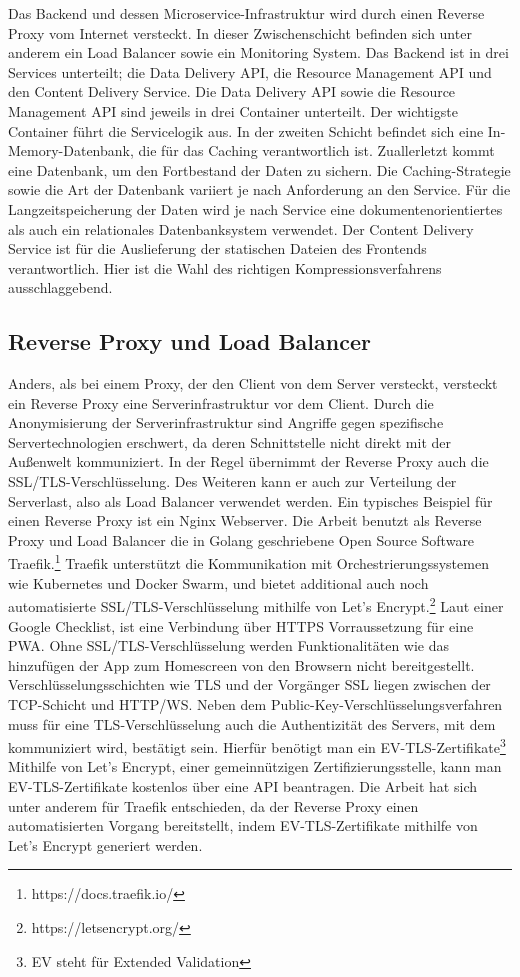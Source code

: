 Das Backend und dessen Microservice-Infrastruktur wird durch einen Reverse Proxy vom Internet versteckt.
In dieser Zwischenschicht befinden sich unter anderem ein Load Balancer sowie ein Monitoring System.
Das Backend ist in drei Services unterteilt; die Data Delivery API, die Resource Management API
und den Content Delivery Service. Die Data Delivery API sowie die Resource Management API sind jeweils
in drei Container unterteilt. Der wichtigste Container führt die Servicelogik aus. In der zweiten
Schicht befindet sich eine In-Memory-Datenbank, die für das Caching verantwortlich ist. Zuallerletzt
kommt eine Datenbank, um den Fortbestand der Daten zu sichern. Die Caching-Strategie sowie die Art der
Datenbank variiert je nach Anforderung an den Service. Für die Langzeitspeicherung der Daten wird je nach Service
eine dokumentenorientiertes als auch ein relationales Datenbanksystem verwendet. Der Content Delivery Service
ist für die Auslieferung der statischen Dateien des Frontends verantwortlich. Hier ist die Wahl des
richtigen Kompressionsverfahrens ausschlaggebend.

\subsection{Reverse Proxy und Load Balancer}
\label{subsec:reverseproxyundloadbalancer}
Anders, als bei einem Proxy, der den Client von dem Server versteckt, versteckt ein Reverse Proxy
eine Serverinfrastruktur vor dem Client. Durch die Anonymisierung der Serverinfrastruktur
sind Angriffe gegen spezifische Servertechnologien erschwert, da deren Schnittstelle
nicht direkt mit der Außenwelt kommuniziert. In der Regel übernimmt der Reverse Proxy
auch die SSL/TLS-Verschlüsselung. Des Weiteren kann er auch zur Verteilung der Serverlast,
also als Load Balancer verwendet werden. Ein typisches Beispiel für einen Reverse Proxy
ist ein Nginx Webserver. Die Arbeit benutzt als Reverse Proxy und Load Balancer die
in Golang geschriebene Open Source Software Traefik.\footnote{https://docs.traefik.io/}
Traefik unterstützt die Kommunikation mit Orchestrierungssystemen wie Kubernetes
und Docker Swarm, und bietet additional auch noch automatisierte SSL/TLS-Verschlüsselung
mithilfe von Let's Encrypt.\footnote{https://letsencrypt.org/} Laut einer Google Checklist,
ist eine Verbindung über HTTPS Vorraussetzung für eine PWA.\cite{GooglePWAChecklist}
Ohne SSL/TLS-Verschlüsselung werden Funktionalitäten wie das hinzufügen der App zum Homescreen
von den Browsern nicht bereitgestellt. Verschlüsselungsschichten wie TLS und der Vorgänger
SSL liegen zwischen der TCP-Schicht und HTTP/WS. Neben dem Public-Key-Verschlüsselungsverfahren
muss für eine TLS-Verschlüsselung auch die Authentizität des Servers, mit dem kommuniziert wird,
bestätigt sein. Hierfür benötigt man ein EV-TLS-Zertifikate\footnote{EV steht für Extended Validation}
Mithilfe von Let's Encrypt, einer gemeinnützigen Zertifizierungsstelle, kann man EV-TLS-Zertifikate
kostenlos über eine API beantragen. Die Arbeit hat sich unter anderem für Traefik entschieden,
da der Reverse Proxy einen automatisierten Vorgang bereitstellt, indem EV-TLS-Zertifikate
mithilfe von Let's Encrypt generiert werden.

